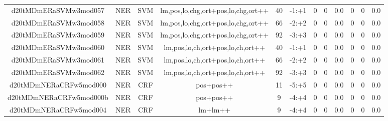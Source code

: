 \documentclass[a4paper]{article}
\begin{document}
\begin{landscape}
\begin{center}
\begin{tabular}{ |c|c|c|c|c|c|c|c|c|c|c|c|}
 
 	
 	\small{ d20tMDmERaSVMw3mod057 } & \small{ NER} & \small{  SVM }  & lm,pos,lo,chg,ort+pos,lo,chg,ort++  &  40 &  \small{  -1:+1 }  &  0 & 0 & 0.0  &  0 & 0 & 0.0 \\
 	

 
 	
 	\small{ d20tMDmERaSVMw3mod058 } & \small{ NER} & \small{  SVM }  & lm,pos,lo,chg,ort+pos,lo,chg,ort++  &  66 &  \small{  -2:+2 }  &  0 & 0 & 0.0  &  0 & 0 & 0.0 \\
 	

 
 	
 	\small{ d20tMDmERaSVMw3mod059 } & \small{ NER} & \small{  SVM }  & lm,pos,lo,chg,ort+pos,lo,chg,ort++  &  92 &  \small{  -3:+3 }  &  0 & 0 & 0.0  &  0 & 0 & 0.0 \\
 	

 
 	
 	\small{ d20tMDmERaSVMw3mod060 } & \small{ NER} & \small{  SVM }  & lm,pos,lo,ch,ort+pos,lo,ch,ort++  &  40 &  \small{  -1:+1 }  &  0 & 0 & 0.0  &  0 & 0 & 0.0 \\
 	

 
 	
 	\small{ d20tMDmERaSVMw3mod061 } & \small{ NER} & \small{  SVM }  & lm,pos,lo,ch,ort+pos,lo,ch,ort++  &  66 &  \small{  -2:+2 }  &  0 & 0 & 0.0  &  0 & 0 & 0.0 \\
 	

 
 	
 	\small{ d20tMDmERaSVMw3mod062 } & \small{ NER} & \small{  SVM }  & lm,pos,lo,ch,ort+pos,lo,ch,ort++  &  92 &  \small{  -3:+3 }  &  0 & 0 & 0.0  &  0 & 0 & 0.0 \\
 	

 
 	
 	\small{ d20tMDmNERaCRFw5mod000 } & \small{ NER} & \small{  CRF }  & pos+pos++  &  11 &  \small{  -5:+5 }  &  0 & 0 & 0.0  &  0 & 0 & 0.0 \\
 	

 
 	
 	\small{ d20tMDmNERaCRFw5mod000b } & \small{ NER} & \small{  CRF }  & pos+pos++  &  9 &  \small{  -4:+4 }  &  0 & 0 & 0.0  &  0 & 0 & 0.0 \\
 	

 
 	
 	\small{ d20tMDmNERaCRFw5mod004 } & \small{ NER} & \small{  CRF }  & lm+lm++  &  9 &  \small{  -4:+4 }  &  0 & 0 & 0.0  &  0 & 0 & 0.0 \\
 	
 \hline
\end{tabular}
\end{center}





\end{landscape}
\end{document}
